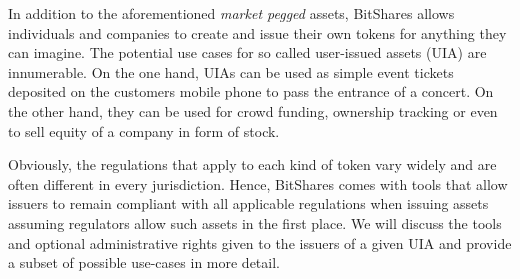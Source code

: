 \label{sec:uia}

In addition to the aforementioned \emph{market pegged} assets, BitShares allows
individuals and companies to create and issue their own tokens for anything
they can imagine. The potential use cases for so called user-issued assets
(UIA) are innumerable. On the one hand, UIAs can be used as simple event
tickets deposited on the customers mobile phone to pass the entrance of a
concert. On the other hand, they can be used for crowd funding, ownership
tracking or even to sell equity of a company in form of stock.

Obviously, the regulations that apply to each kind of token vary widely and are
often different in every jurisdiction. Hence, BitShares comes with tools that
allow issuers to remain compliant with all applicable regulations when issuing
assets assuming regulators allow such assets in the first place. We will
discuss the tools and optional administrative rights given to the issuers of a
given UIA and provide a subset of possible use-cases in more detail.
